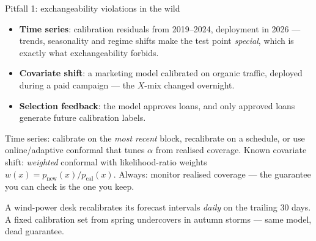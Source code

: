 \documentclass[aspectratio=169,11pt]{beamer}
\begin{document}
\begin{frame}{Pitfall 1: exchangeability violations in the wild}
  \begin{itemize}
    \item \textbf{Time series}: calibration residuals from 2019--2024, deployment in
          2026 --- trends, seasonality and regime shifts make the test point
          \emph{special}, which is exactly what exchangeability forbids.
    \item \textbf{Covariate shift}: a marketing model calibrated on organic traffic,
          deployed during a paid campaign --- the $X$-mix changed overnight.
    \item \textbf{Selection feedback}: the model approves loans, and only approved
          loans generate future calibration labels.
  \end{itemize}
  \begin{readme}
    Time series: calibrate on the \emph{most recent} block, recalibrate on a schedule,
    or use online/adaptive conformal that tunes $\alpha$ from realised coverage.
    Known covariate shift: \emph{weighted} conformal with likelihood-ratio weights
    $w(x) = p_{\text{new}}(x)/p_{\text{cal}}(x)$. Always: monitor realised coverage
    --- the guarantee you can check is the one you keep.
  \end{readme}
  \begin{industry}
    A wind-power desk recalibrates its forecast intervals \emph{daily} on the trailing
    30 days. A fixed calibration set from spring undercovers in autumn storms ---
    same model, dead guarantee.
  \end{industry}
\end{frame}
\end{document}
